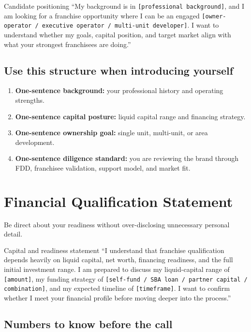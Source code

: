 \documentclass[11pt]{article}
\newcommand{\placeholder}[1]{\textcolor{accent}{\texttt{[#1]}}}
\begin{document}
\begin{scriptbox}{Candidate positioning}
``My background is in \placeholder{professional background}, and I am looking for a franchise opportunity where I can be an engaged \placeholder{owner-operator / executive operator / multi-unit developer}. I want to understand whether my goals, capital position, and target market align with what your strongest franchisees are doing.''
\end{scriptbox}

\subsection{Use this structure when introducing yourself}

\begin{enumerate}
  \item \textbf{One-sentence background:} your professional history and operating strengths.
  \item \textbf{One-sentence capital posture:} liquid capital range and financing strategy.
  \item \textbf{One-sentence ownership goal:} single unit, multi-unit, or area development.
  \item \textbf{One-sentence diligence standard:} you are reviewing the brand through FDD, franchisee validation, support model, and market fit.
\end{enumerate}

\section{Financial Qualification Statement}

Be direct about your readiness without over-disclosing unnecessary personal detail.

\begin{scriptbox}{Capital and readiness statement}
``I understand that franchise qualification depends heavily on liquid capital, net worth, financing readiness, and the full initial investment range. I am prepared to discuss my liquid-capital range of \placeholder{amount}, my funding strategy of \placeholder{self-fund / SBA loan / partner capital / combination}, and my expected timeline of \placeholder{timeframe}. I want to confirm whether I meet your financial profile before moving deeper into the process.''
\end{scriptbox}

\subsection{Numbers to know before the call}
\end{document}
